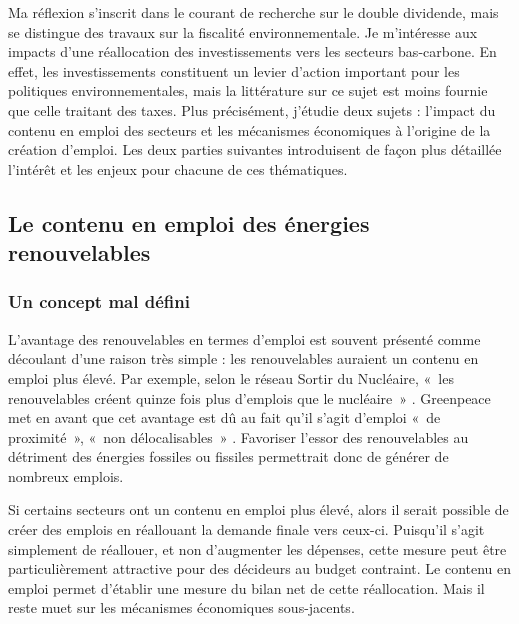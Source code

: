 Ma réflexion s'inscrit dans le courant de recherche sur le double dividende, mais se distingue des travaux sur la fiscalité environnementale. Je m'intéresse aux impacts d'une réallocation des investissements vers les secteurs bas-carbone. En effet, les investissements constituent un levier d'action important pour les politiques environnementales, mais la littérature sur ce sujet est moins fournie que celle traitant des taxes.
Plus précisément, j'étudie deux sujets : l'impact du contenu en emploi des secteurs et les mécanismes économiques à l'origine de la création d'emploi. Les deux parties suivantes introduisent de façon plus détaillée l'intérêt et les enjeux pour chacune de ces thématiques.


\subsection{Le contenu en emploi des énergies renouvelables}

\subsubsection{Un concept mal défini}
L’avantage des renouvelables en termes d’emploi est souvent présenté comme découlant d'une raison très simple : les renouvelables auraient un contenu en emploi plus élevé. Par exemple, selon le réseau Sortir du Nucléaire, «~les renouvelables créent quinze fois plus d’emplois que le nucléaire~» \citep{Les7ventsduCotentin2009}. Greenpeace met en avant que cet avantage est dû au fait qu’il s’agit d’emploi «~de proximité~», «~non délocalisables~» \citep{Greenpeace2011}. Favoriser l’essor des renouvelables au détriment des énergies fossiles ou fissiles permettrait donc de générer de nombreux emplois.

Si certains secteurs ont un contenu en emploi plus élevé, alors il serait possible de créer des emplois en réallouant la demande finale vers ceux-ci. Puisqu’il s’agit simplement de réallouer, et non d’augmenter les dépenses, cette mesure peut être particulièrement attractive pour des décideurs au budget contraint. Le contenu en emploi permet d'établir une mesure du bilan net de cette réallocation. Mais il reste muet sur les mécanismes économiques sous-jacents. 

